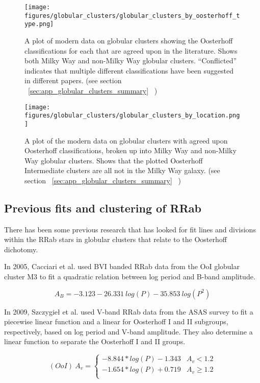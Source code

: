 \documentclass[]{article}
\begin{document}
\begin{figure}
	\centering
	\texttt{[image: figures/globular\_clusters/globular\_clusters\_by\_oosterhoff\_type.png]}
	\caption{A plot of modern data on globular clusters showing the Oosterhoff classifications for each that are agreed upon in the literature. Shows both Milky Way and non-Milky Way globular clusters. ``Conflicted'' indicates that multiple different classifications have been suggested in different papers. (see section ~\ref{sec:app_globular_clusters_summary}~ )}
	\label{fig:modern_globular_clusters}
\end{figure}

\begin{figure}
	\centering
	\texttt{[image: figures/globular\_clusters/globular\_clusters\_by\_location.png]}
	\caption{A plot of the modern data on globular clusters with agreed upon Oosterhoff classifications, broken up into Milky Way and non-Milky Way globular clusters. Shows that the plotted Oosterhoff Intermediate clusters are all not in the Milky Way galaxy. (see section ~\ref{sec:app_globular_clusters_summary}~ )}
	\label{fig:modern_globular_clusters_location}
\end{figure}

\subsection{Previous fits and clustering of RRab}
There has been some previous research that has looked for fit lines and divisions within the RRab stars in globular clusters that relate to the Oosterhoff dichotomy.


In 2005, Cacciari et al. used BVI banded RRab data from the OoI globular cluster M3 to fit a quadratic relation between log period and B-band amplitude. \cite{cacciari_2005}

$$
A_{B} = -3.123 - 26.331~log(P) - 35.853~log(P^{2})
$$

In 2009, Szczygie{\l} et al. used V-band RRab data from the ASAS survey to fit a piecewise linear function and a linear for Oosterhoff I and II subgroups, respectively, based on log period and V-band amplitude. They also determine a linear function to separate the Oosterhoff I and II groups. \cite{szczygiel_2009}

$$
(OoI)~A_{v} =
\begin{cases} 
	-8.844 * log(P) - 1.343 & A_{v} < 1.2 \\
	-1.654 * log(P) + 0.719 & A_{v} \geq 1.2 \\
\end{cases}
$$
\end{document}
